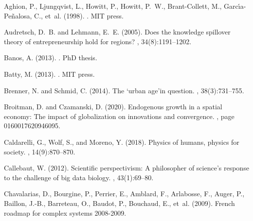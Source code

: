 \documentclass[10pt,letterpaper]{article}
\begin{document}
%
%

\begin{thebibliography}{}

Aghion, P., Ljungqvist, L., Howitt, P., Howitt, P.~W., Brant-Collett, M.,
  Garc{\'\i}a-Pe{\~n}alosa, C., et~al. (1998).
.
\newblock MIT press.

Audretsch, D.~B. and Lehmann, E.~E. (2005).
\newblock Does the knowledge spillover theory of entrepreneurship hold for
  regions?
, 34(8):1191--1202.

Banos, A. (2013).
.
\newblock PhD thesis.

Batty, M. (2013).
.
\newblock MIT press.

Brenner, N. and Schmid, C. (2014).
\newblock The ‘urban age’in question.
,
  38(3):731--755.

Broitman, D. and Czamanski, D. (2020).
\newblock Endogenous growth in a spatial economy: The impact of globalization
  on innovations and convergence.
, page 0160017620946095.

Caldarelli, G., Wolf, S., and Moreno, Y. (2018).
\newblock Physics of humans, physics for society.
, 14(9):870--870.

Callebaut, W. (2012).
\newblock Scientific perspectivism: A philosopher of science’s response to
  the challenge of big data biology.
, 43(1):69--80.

Chavalarias, D., Bourgine, P., Perrier, E., Amblard, F., Arlabosse, F., Auger,
  P., Baillon, J.-B., Barreteau, O., Baudot, P., Bouchaud, E., et~al. (2009).
\newblock French roadmap for complex systems 2008-2009.


\end{thebibliography}
\end{document}
